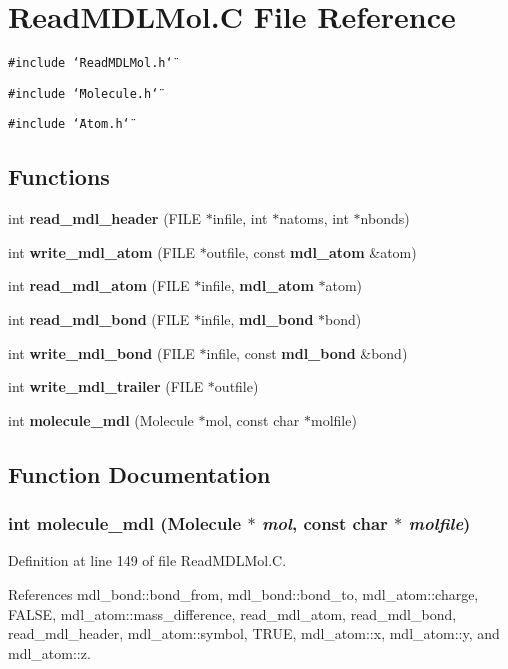 \section{Read\-MDLMol.C File Reference}
\label{ReadMDLMol_8C}
{\tt \#include \char`\"{}Read\-MDLMol.h\char`\"{}}\par
{\tt \#include \char`\"{}Molecule.h\char`\"{}}\par
{\tt \#include \char`\"{}Atom.h\char`\"{}}\par
\subsection*{Functions}
\begin{CompactItemize}
\item 
int {\bf read\_\-mdl\_\-header} (FILE $\ast$infile, int $\ast$natoms, int $\ast$nbonds)
\item 
int {\bf write\_\-mdl\_\-atom} (FILE $\ast$outfile, const {\bf mdl\_\-atom} \&atom)
\item 
int {\bf read\_\-mdl\_\-atom} (FILE $\ast$infile, {\bf mdl\_\-atom} $\ast$atom)
\item 
int {\bf read\_\-mdl\_\-bond} (FILE $\ast$infile, {\bf mdl\_\-bond} $\ast$bond)
\item 
int {\bf write\_\-mdl\_\-bond} (FILE $\ast$infile, const {\bf mdl\_\-bond} \&bond)
\item 
int {\bf write\_\-mdl\_\-trailer} (FILE $\ast$outfile)
\item 
int {\bf molecule\_\-mdl} (Molecule $\ast$mol, const char $\ast$molfile)
\end{CompactItemize}


\subsection{Function Documentation}
\subsubsection{\setlength{\rightskip}{0pt plus 5cm}int molecule\_\-mdl (Molecule $\ast$ {\em mol}, const char $\ast$ {\em molfile})}\label{ReadMDLMol_8C_a6}




Definition at line 149 of file Read\-MDLMol.C.

References mdl\_\-bond::bond\_\-from, mdl\_\-bond::bond\_\-to, mdl\_\-atom::charge, FALSE, mdl\_\-atom::mass\_\-difference, read\_\-mdl\_\-atom, read\_\-mdl\_\-bond, read\_\-mdl\_\-header, mdl\_\-atom::symbol, TRUE, mdl\_\-atom::x, mdl\_\-atom::y, and mdl\_\-atom::z.
